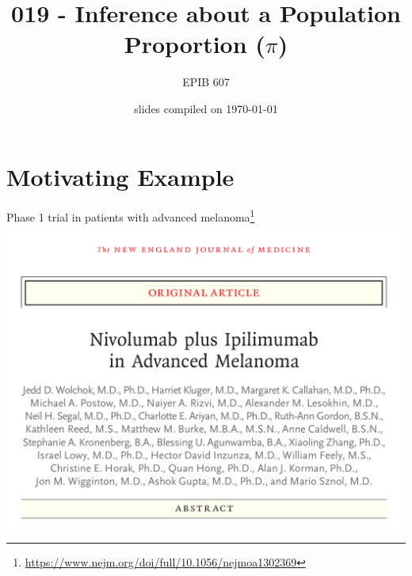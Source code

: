 \documentclass[10pt]{beamer}\usepackage[]{graphicx}\usepackage[]{color}
\begin{document}
	
	
	

	
\title{019 - Inference about a Population Proportion ($\pi$)}
\author{EPIB 607}

\date{slides compiled on \today}

\maketitle


\section{Motivating Example}

\begin{frame}{Phase 1 trial in patients with advanced melanoma\footnote{\tiny \url{https://www.nejm.org/doi/full/10.1056/nejmoa1302369}}}
	\centering
\includegraphics[scale=0.25]{wolchok.png}
\end{frame}
\end{document}
